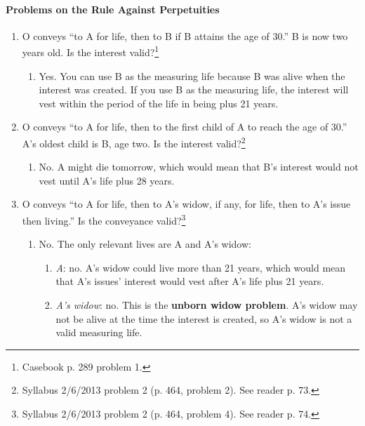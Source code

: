 \paragraph{Problems on the Rule Against Perpetuities}
\begin{enumerate}
    \item O conveys ``to A for life, then to B if B attains the age of 30.'' B 
    is now two years old. Is the interest valid?\footnote{Casebook p. 289 
    problem 1.}
    \begin{enumerate}
        \item Yes. You can use B as the measuring life because B was alive 
        when the interest was created. If you use B as the measuring life, the 
        interest will vest within the period of the life in being plus 21 
        years.
    \end{enumerate}
    \item O conveys ``to A for life, then to the first child of A to reach the 
    age of 30.'' A's oldest child is B, age two. Is the interest 
    valid?\footnote{Syllabus 2/6/2013 problem 2 (p. 464, problem 2). See 
    reader p. 73.}
    \begin{enumerate}
        \item No. A might die tomorrow, which would 
        mean that B's interest would not vest until A's life plus 28 
        years.
    \end{enumerate}
    \item O conveys ``to A for life, then to A's widow, if any, for life, then 
    to A's issue then living.'' Is the conveyance valid?\footnote{Syllabus 
    2/6/2013 problem 2 (p. 464, problem 4). See reader p. 74.}
    \begin{enumerate}
        \item No. The only relevant lives are A and A's widow:
        \begin{enumerate}
            \item \emph{A}: no. A's widow could live more than 21 years, which 
            would mean that A's issues' interest would vest after A's life 
            plus 21 years.
            \item \emph{A's widow}: no. This is the \textbf{unborn widow 
            problem}. A's widow may not be alive at the time the interest is 
            created, so A's widow is not a valid measuring life.
        \end{enumerate}
    \end{enumerate}

\end{enumerate}
